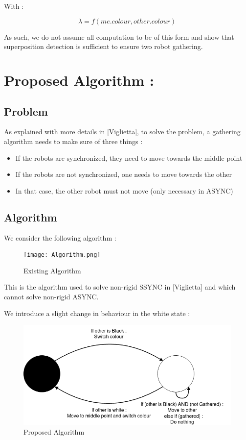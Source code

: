 \documentclass[11pt]{article}
\begin{document}
With :

$$ \lambda = f(me.colour, other.colour)$$

As such, we do not assume all computation to be of this form and show that superposition detection is sufficient to ensure two robot gathering.

\section{Proposed Algorithm :}
\subsection{Problem}

As explained with more details in [Viglietta], to solve the problem, a gathering algorithm needs to make sure of three things : 

\begin{itemize}
\item If the robots are synchronized, they need to move towards the middle point
\item If the robots are not synchronized, one needs to move towards the other
\item In that case, the other robot must not move (only necessary in ASYNC)
\end{itemize}

\subsection{Algorithm}
We consider the following algorithm :

\begin{figure}[H]
	\centering
	\texttt{[image: Algorithm.png]}
	\caption{Existing Algorithm}
\end{figure}

This is the algorithm used to solve non-rigid SSYNC in [Viglietta] and which cannot solve non-rigid ASYNC.

We introduce a slight change in behaviour in the white state :

\begin{figure}[H]
	\centering
	\includegraphics[width=0.8\linewidth]{Algorithm2.png}
	\caption{Proposed Algorithm}
\end{figure}
\end{document}

